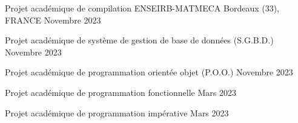 

\begin{cventries}

  \cventry
    {Projet académique de compilation} %
    {ENSEIRB-MATMECA} %
    {Bordeaux (33), FRANCE} %
    {Novembre 2023} %
    {
      \begin{cvitems} %
        \item{}
      \end{cvitems}
    }
  \cventry
    {Projet académique de système de gestion de base de données (S.G.B.D.)} %
    {} %
    {} %
    {Novembre 2023} %
    {
      \begin{cvitems} %
        \item{}
      \end{cvitems}
    }
  \cventry
    {Projet académique de programmation orientée objet (P.O.O.)} %
    {} %
    {} %
    {Novembre 2023} %
    {
      \begin{cvitems} %
        \item{}
      \end{cvitems}
    }
  \cventry
    {Projet académique de programmation fonctionnelle} %
    {} %
    {} %
    {Mars 2023} %
    {
      \begin{cvitems} %
        \item{}
      \end{cvitems}
    }
  \cventry
    {Projet académique de programmation impérative} %
    {} %
    {} %
    {Mars 2023} %
    {
      \begin{cvitems} %

\end{cvitems}}
\end{cventries}
